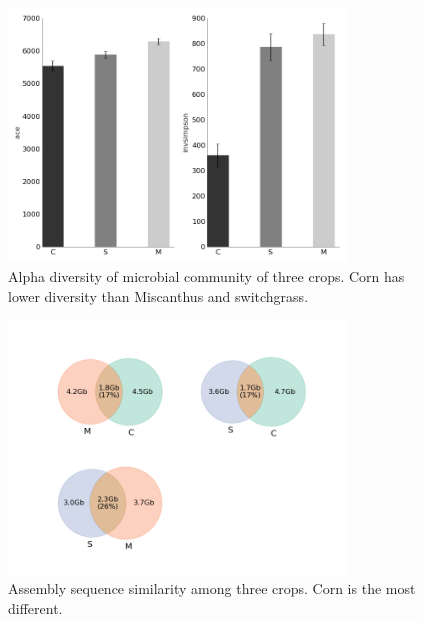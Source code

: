 \documentclass[12pt]{article}
\begin{document}
    \begin{figure}[tbph!]
    \centering
    \includegraphics[width=0.8\textwidth]{figures/otu-alpha-div}
    \caption[Alpha diversity]{Alpha diversity of microbial community of three crops. Corn has lower diversity than Miscanthus and switchgrass.}
    \label{fig:otu-alpha-div}
    \end{figure}



    \begin{figure}[tbph!]
    \centering
    \includegraphics[width=0.8\textwidth]{figures/contig-sim-venn}
    \caption[Assembly sequence similarity]{Assembly sequence similarity among three crops. Corn is the most different.}
    \label{fig:contig-sim-venn}
    \end{figure}
\end{document}
